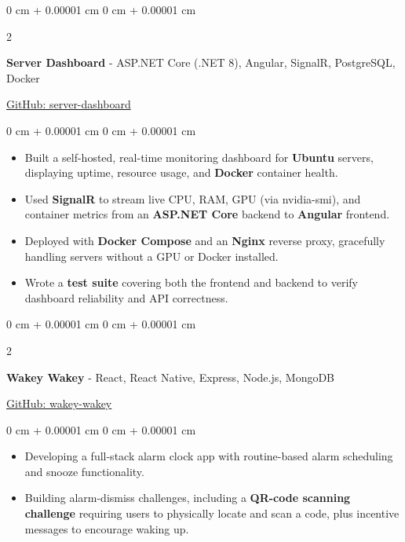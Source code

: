 \documentclass[9pt, letterpaper]{extarticle}
\newenvironment{highlights}{
    \begin{itemize}[
        topsep=0.10 cm,
        parsep=0.10 cm,
        partopsep=0pt,
        itemsep=0pt,
        leftmargin=0 cm + 10pt
    ]
}{
    \end{itemize}
} %
\newenvironment{onecolentry}{
    \begin{adjustwidth}{
        0 cm + 0.00001 cm
    }{
        0 cm + 0.00001 cm
    }
}{
    \end{adjustwidth}
} %
\newenvironment{twocolentry}[2][]{
    \onecolentry
    \def\secondColumn{#2}
    \setcolumnwidth{\fill, 4.5 cm}
    \begin{paracol}{2}
}{
    \switchcolumn \raggedleft \secondColumn
    \end{paracol}
    \endonecolentry
} %
\begin{document}
        \begin{twocolentry}
        {\href{https://github.com/ayushtvora/server-dashboard}{GitHub: server-dashboard}}
            \textbf{Server Dashboard} - ASP.NET Core (.NET 8), Angular, SignalR, PostgreSQL, Docker
        \end{twocolentry}
        \vspace{0.10 cm}
        \begin{onecolentry}
            \begin{highlights}
                \item Built a self-hosted, real-time monitoring dashboard for \textbf{Ubuntu} servers, displaying uptime, resource usage, and \textbf{Docker} container health.
                \item Used \textbf{SignalR} to stream live CPU, RAM, GPU (via nvidia-smi), and container metrics from an \textbf{ASP.NET Core} backend to \textbf{Angular} frontend.
                \item Deployed with \textbf{Docker Compose} and an \textbf{Nginx} reverse proxy, gracefully handling servers without a GPU or Docker installed.
                \item Wrote a \textbf{test suite} covering both the frontend and backend to verify dashboard reliability and API correctness.
            \end{highlights}
        \end{onecolentry}

        \vspace{0.2 cm}

        \begin{twocolentry}
        {\href{https://github.com/ayushtvora/wakey-wakey}{GitHub: wakey-wakey}}
            \textbf{Wakey Wakey} - React, React Native, Express, Node.js, MongoDB
        \end{twocolentry}
        \vspace{0.10 cm}
        \begin{onecolentry}
            \begin{highlights}
                \item Developing a full-stack alarm clock app with routine-based alarm scheduling and snooze functionality.
                \item Building alarm-dismiss challenges, including a \textbf{QR-code scanning challenge} requiring users to physically locate and scan a code, plus incentive messages to encourage waking up.
            \end{highlights}
        \end{onecolentry}
\end{document}
